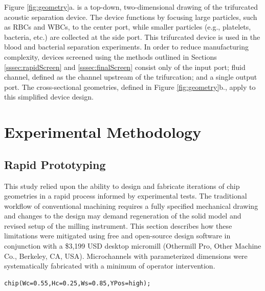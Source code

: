 Figure \ref{fig:geometry}a. is a top-down, two-dimensional drawing of the trifurcated acoustic separation device. The device functions by focusing large particles, such as RBCs and WBCs, to the center port, while smaller particles (e.g., platelets, bacteria, etc.) are collected at the side port. This trifurcated device is used in the blood and bacterial separation experiments. In order to reduce manufacturing complexity, devices screened using the methods outlined in Sections \ref{sssec:rapidScreen} and \ref{sssec:finalScreen} consist only of the input port; fluid channel, defined as the channel upstream of the trifurcation; and a single output port. The cross-sectional geometries, defined in Figure \ref{fig:geometry}b., apply to this simplified device design. 

\section{Experimental Methodology}
\label{sec:experiment}

\subsection{Rapid Prototyping}
\label{sec:rp}
This study relied upon the ability to design and fabricate iterations of chip geometries in a rapid process informed by experimental tests. The traditional workflow of conventional machining requires a fully specified mechanical drawing and changes to the design may demand regeneration of the solid model and revised setup of the milling instrument.  This section describes how these limitations were mitigated using free and open-source design software in conjunction with a \$3,199 USD desktop micromill (Othermill Pro, Other Machine Co., Berkeley, CA, USA).  Microchannels with parameterized dimensions were systematically fabricated with a minimum of operator intervention.

\begin{minipage}{0.95\linewidth}
\begin{lstlisting}[caption={The custom OpenSCAD library allows solid model creation using just a single line of code},label={lst:chip}, frame=single, language=scad]
  chip(Wc=0.55,Hc=0.25,Ws=0.85,YPos=high);
\end{lstlisting}
\end{minipage}

